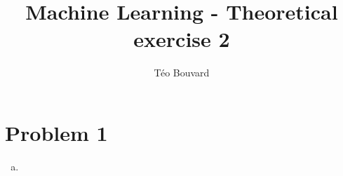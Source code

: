 \documentclass[a4paper, 10pt, twoside]{article}
\begin{document}
\title{Machine Learning - Theoretical exercise 2}
\author{T\'eo Bouvard}
\maketitle

\section*{Problem 1}
\begin{enumerate}[a)]
    \item 
\end{enumerate}
\end{document}
